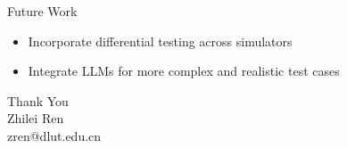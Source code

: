 \documentclass{beamer}
\begin{document}
\begin{frame}{Future Work}
\begin{itemize}
\item Incorporate differential testing across simulators
\item Integrate LLMs for more complex and realistic test cases
\end{itemize}
\end{frame}

\begin{frame}
\centering
\Large
Thank You\\
\vspace{1cm}
Zhilei Ren\\
\small
zren@dlut.edu.cn
\end{frame}
\end{document}

